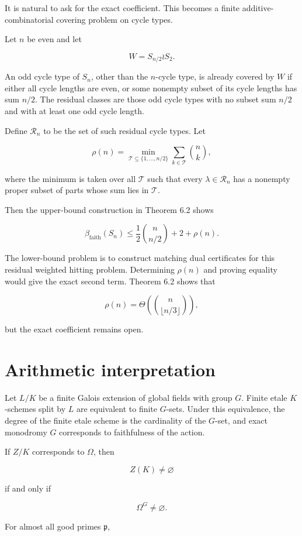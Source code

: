 \documentclass[11pt]{article}
\begin{document}
It is natural to ask for the exact coefficient. This becomes a finite additive-combinatorial covering problem on cycle types.

Let $n$ be even and let

\[
W=S_{n/2}\wr S_2.
\]

An odd cycle type of $S_n$, other than the $n$-cycle type, is already covered by $W$ if either all cycle lengths are even, or some nonempty subset of its cycle lengths has sum $n/2$. The residual classes are those odd cycle types with no subset sum $n/2$ and with at least one odd cycle length.

Define $\mathcal R_n$ to be the set of such residual cycle types. Let

\[
\rho(n)
=
\min_{\mathcal T\subseteq\{1,\dots,n/2\}}
\sum_{k\in\mathcal T}\binom nk,
\]

where the minimum is taken over all $\mathcal T$ such that every $\lambda\in\mathcal R_n$ has a nonempty proper subset of parts whose sum lies in $\mathcal T$.

Then the upper-bound construction in Theorem 6.2 shows

\[
\beta_{\mathrm{faith}}(S_n)
\le
\frac12\binom n{n/2}
+
2+\rho(n).
\]

The lower-bound problem is to construct matching dual certificates for this residual weighted hitting problem. Determining $\rho(n)$ and proving equality would give the exact second term. Theorem 6.2 shows that

\[
\rho(n)=\Theta\left(\binom n{\lfloor n/3\rfloor}\right),
\]

but the exact coefficient remains open.

\section{Arithmetic interpretation}

Let $L/K$ be a finite Galois extension of global fields with group $G$. Finite etale $K$-schemes split by $L$ are equivalent to finite $G$-sets. Under this equivalence, the degree of the finite etale scheme is the cardinality of the $G$-set, and exact monodromy $G$ corresponds to faithfulness of the action.

If $Z/K$ corresponds to $\Omega$, then

\[
Z(K)\ne\varnothing
\]

if and only if

\[
\Omega^G\ne\varnothing.
\]

For almost all good primes $\mathfrak p$,
\end{document}
